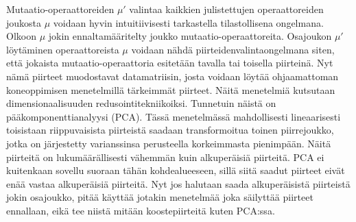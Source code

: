 \documentclass{tktltiki}
\begin{document}
Mutaatio-operaattoreiden $\mu'$ valintaa kaikkien julistettujen operaattoreiden joukosta $\mu$ voidaan hyvin intuitiivisesti tarkastella tilastollisena ongelmana. Olkoon $\mu$ jokin ennaltamääritelty joukko mutaatio-operaattoreita. Osajoukon $\mu'$ löytäminen operaattoreista $\mu$ voidaan nähdä piirteidenvalintaongelmana siten, että jokaista mutaatio-operaattoria esitetään tavalla tai toisella piirteinä. Nyt nämä piirteet muodostavat datamatriisin, josta voidaan löytää ohjaamattoman koneoppimisen menetelmillä tärkeimmät piirteet. Näitä menetelmiä kutsutaan dimensionaalisuuden redusointitekniikoiksi. Tunnetuin näistä on pääkomponenttianalyysi (PCA). Tässä menetelmässä mahdollisesti lineaarisesti toisistaan riippuvaisista piirteistä saadaan transformoitua toinen piirrejoukko, jotka on järjestetty varianssinsa perusteella korkeimmasta pienimpään. Näitä piirteitä on lukumäärällisesti vähemmän kuin alkuperäisiä piirteitä. PCA ei kuitenkaan sovellu suoraan tähän kohdealueeseen, sillä siitä saadut piirteet eivät enää vastaa alkuperäisiä piirteitä. Nyt jos halutaan saada alkuperäisistä piirteistä jokin osajoukko, pitää käyttää jotakin menetelmää joka säilyttää piirteet ennallaan, eikä tee niistä mitään koostepiirteitä kuten PCA:ssa. 
\end{document}
